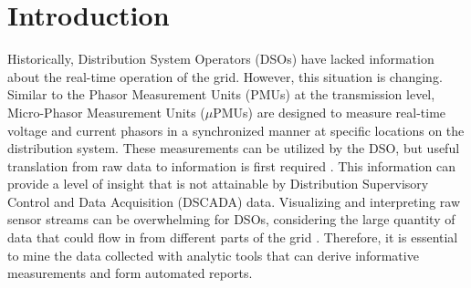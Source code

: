 \documentclass[twocolumn]{IEEEtran}
\newcommand{\mup}{\mu \text{PMU}}
\begin{document}
\section{Introduction}
Historically, Distribution System Operators (DSOs) have lacked information about the real-time operation of the grid. However, this situation is changing. Similar to the Phasor Measurement Units (PMUs) at the transmission level, Micro-Phasor Measurement Units ($\mup$s) are designed to measure real-time voltage and current phasors in a synchronized manner at specific locations on the distribution system. These measurements can be utilized by the DSO, but useful translation from raw data to information is first required \cite{von2014micro, scoping_study}. This information can provide a level of insight that is not attainable by Distribution Supervisory Control and Data Acquisition (DSCADA) data. Visualizing and interpreting raw sensor streams can be overwhelming for DSOs, considering the large quantity of data that could flow in from different parts of the grid \cite{kezunovic2013role}. Therefore, it is essential to mine the data collected with analytic tools that can derive informative measurements and form automated reports.
\end{document}
